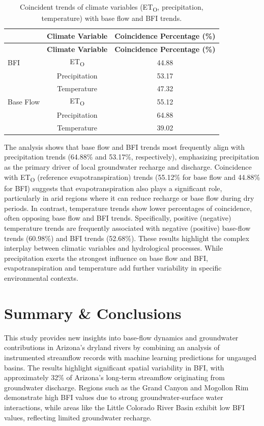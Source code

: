 \documentclass[
]{agujournal2019}
\begin{document}
\begin{longtable}[]{@{}lcc@{}}
\caption{Coincident trends of climate variables (ET\textsubscript{O},
precipitation, temperature) with base flow and BFI
trends.}\label{tbl-coincident-trends}\tabularnewline
\toprule\noalign{}
& \textbf{Climate Variable} & \textbf{Coincidence Percentage (\%)} \\
\midrule\noalign{}
\endfirsthead
\toprule\noalign{}
& \textbf{Climate Variable} & \textbf{Coincidence Percentage (\%)} \\
\midrule\noalign{}
\endhead
\bottomrule\noalign{}
\endlastfoot
BFI & ET\textsubscript{O} & 44.88 \\
& Precipitation & 53.17 \\
& Temperature & 47.32 \\
Base Flow & ET\textsubscript{O} & 55.12 \\
& Precipitation & 64.88 \\
& Temperature & 39.02 \\
\end{longtable}

The analysis shows that base flow and BFI trends most frequently align
with precipitation trends (64.88\% and 53.17\%, respectively),
emphasizing precipitation as the primary driver of local groundwater
recharge and discharge. Coincidence with ET\textsubscript{O} (reference
evapotranspiration) trends (55.12\% for base flow and 44.88\% for BFI)
suggests that evapotranspiration also plays a significant role,
particularly in arid regions where it can reduce recharge or base flow
during dry periods. In contrast, temperature trends show lower
percentages of coincidence, often opposing base flow and BFI trends.
Specifically, positive (negative) temperature trends are frequently
associated with negative (positive) base-flow trends (60.98\%) and BFI
trends (52.68\%). These results highlight the complex interplay between
climatic variables and hydrological processes. While precipitation
exerts the strongest influence on base flow and BFI, evapotranspiration
and temperature add further variability in specific environmental
contexts.

\section{Summary \& Conclusions}\label{sec-conclusion}

This study provides new insights into base-flow dynamics and groundwater
contributions in Arizona's dryland rivers by combining an analysis of
instrumented streamflow records with machine learning predictions for
ungauged basins. The results highlight significant spatial variability
in BFI, with approximately 32\% of Arizona's long-term streamflow
originating from groundwater discharge. Regions such as the Grand Canyon
and Mogollon Rim demonstrate high BFI values due to strong
groundwater-surface water interactions, while areas like the Little
Colorado River Basin exhibit low BFI values, reflecting limited
groundwater recharge.
\end{document}
